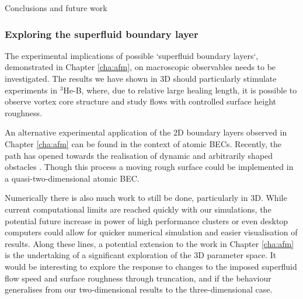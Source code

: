 \begin{chapter}{\label{cha:conc}Conclusions and future work}
\subsubsection{Exploring the superfluid boundary layer}
The experimental implications of possible `superfluid boundary layers`, demonstrated in Chapter \ref{cha:afm}, on macroscopic observables needs to be investigated.  The results we have shown in 3D should particularly stimulate experiments in $^3$He-B, where, due to relative
large healing length, it is possible to observe vortex core structure and study flows with controlled surface height roughness.

An alternative experimental application of the 2D boundary layers observed in Chapter \ref{cha:afm} can be found in the context of atomic BECs. Recently, the path has opened towards the realisation of dynamic and arbitrarily shaped obstacles \cite{Henderson09}. Though this process a moving rough surface could be implemented in a quasi-two-dimensional atomic BEC.

Numerically there is also much work to still be done, particularly in 3D. While current computational limits are reached quickly with our simulations, the potential future increase in power of high performance clusters or even desktop computers could allow for quicker numerical simulation and easier visualisation of results. Along these lines, a potential extension to the work in Chapter \ref{cha:afm} is the undertaking of a significant exploration of the 3D parameter space. It would be interesting to explore the response to changes to the imposed superfluid flow speed and surface roughness through truncation, and if the behaviour generalises from our two-dimensional results to the three-dimensional case.
\end{chapter}
